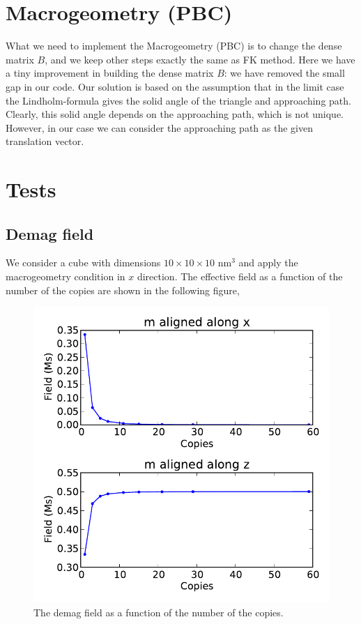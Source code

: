 \documentclass[paper=a4]{scrartcl}
\begin{document}
\section{Macrogeometry (PBC)}
What we need to implement the Macrogeometry (PBC) is to change the dense matrix $B$, and we keep other
steps exactly the same as FK method. Here we have a tiny improvement in building the dense matrix $B$:
we have removed the small gap in our code. Our solution is based on the assumption that in the limit 
case the Lindholm-formula gives the solid angle of the triangle and approaching path. Clearly, this 
solid angle depends on the approaching path, which is not unique. However, in our case we can consider the 
approaching path as the given translation vector.

\section{Tests}
\subsection{Demag field}
We consider a cube with dimensions $10\times 10 \times 10$ nm$^3$ and apply the macrogeometry condition in $x$ direction. 
The effective field as a function of the number of the copies are shown in the following figure, 
\begin{figure}[tbhp]
\begin{center}
\includegraphics[scale=0.8]{figure/fields.pdf} 
\caption{The demag field as a function of the number of the copies.}
\label{fig_demag}
\end{center}
\end{figure}
\end{document}
